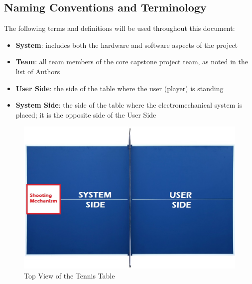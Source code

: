 \documentclass[11pt]{article}
\begin{document}
\subsection{Naming Conventions and Terminology}
The following terms and definitions will be used throughout this document:
\begin{itemize}
\item \textbf{System}: includes both the hardware and software aspects of the project
\item \textbf{Team}: all team members of the core capstone project team, as noted in the list of Authors
\item \textbf{User Side}: the side of the table where the user (player) is standing
\item \textbf{System Side}: the side of the table where the electromechanical system is placed; it is the opposite side of the User Side
\end{itemize}
\begin{figure}[htbp]
   \centering
   \includegraphics[width=1\textwidth]{img/Table-Tennis-Top-View.png} %
   \caption{Top View of the Tennis Table}
   \label{fig:table-tennis-top-view}
\end{figure}
\end{document}
